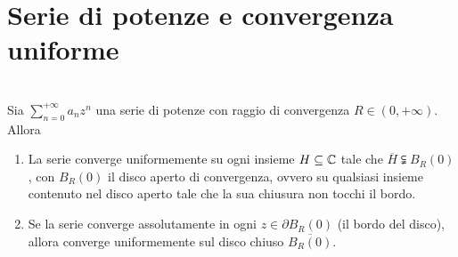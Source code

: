 \section{Serie di potenze e convergenza uniforme}
\begin{theorema}~{}\\\label{convergenzasottoinsiemeH}
	Sia $\displaystyle\sum_{n=0}^{+\infty}a_nz^n$ una serie di potenze con raggio di convergenza $R\in\left(0,+\infty\right)$. Allora
	\begin{enumerate}
		\item La serie converge uniformemente su ogni insieme $H\subseteq\mathbb{C}$ tale che $\overline{H}\subsetneqq B_R\left(0\right)$, con $B_R\left(0\right)$ il disco aperto di convergenza, ovvero su qualsiasi insieme contenuto nel disco aperto tale che la sua chiusura non tocchi il bordo.
		\item Se la serie converge assolutamente in ogni $z\in\partial B_R\left(0\right)$ (il bordo del disco), allora converge uniformemente sul disco chiuso $\overline{B_R\left(0\right)}$.
	\end{enumerate}
\end{theorema}
